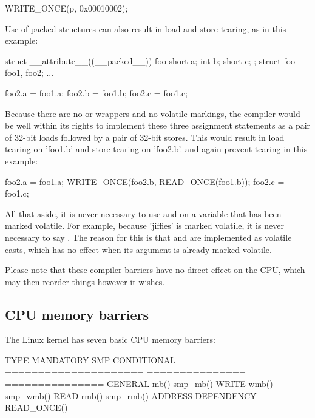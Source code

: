 \begin{itemize}
\begin{VerbatimU}
	WRITE_ONCE(p, 0x00010002);
\end{VerbatimU}

     Use of packed structures can also result in load and store tearing,
     as in this example:

\begin{VerbatimU}
	struct __attribute__((__packed__)) foo {
		short a;
		int b;
		short c;
	};
	struct foo foo1, foo2;
	...

	foo2.a = foo1.a;
	foo2.b = foo1.b;
	foo2.c = foo1.c;
\end{VerbatimU}

     Because there are no  or  wrappers and no
     volatile markings, the compiler would be well within its rights to
     implement these three assignment statements as a pair of 32-bit
     loads followed by a pair of 32-bit stores.
     This would result in load tearing on 'foo1.b' and store tearing
     on 'foo2.b'.
      and  again prevent tearing in
     this example:

\begin{VerbatimU}
	foo2.a = foo1.a;
	WRITE_ONCE(foo2.b, READ_ONCE(foo1.b));
	foo2.c = foo1.c;
\end{VerbatimU}
\end{itemize}

All that aside, it is never necessary to use  and
 on a variable that has been marked volatile.
For example, because 'jiffies' is marked volatile, it is never necessary to
say .
The reason for this is that  and  are
implemented as volatile casts, which has no effect when its argument is
already marked volatile.

Please note that these compiler barriers have no direct effect on the CPU,
which may then reorder things however it wishes.


\subsection{CPU memory barriers}

The Linux kernel has seven basic CPU memory barriers:

\begin{VerbatimU}
	TYPE                  MANDATORY       SMP CONDITIONAL
	===================== =============== ===============
	GENERAL               mb()            smp_mb()
	WRITE                 wmb()           smp_wmb()
	READ                  rmb()           smp_rmb()
	ADDRESS DEPENDENCY                    READ_ONCE()
\end{VerbatimU}

